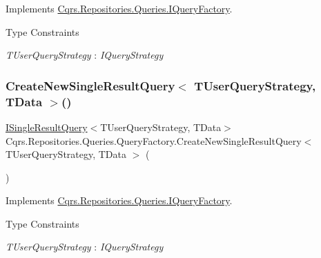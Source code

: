 Implements \hyperlink{interfaceCqrs_1_1Repositories_1_1Queries_1_1IQueryFactory_af8b443851e8112dc70cbc7fe32029ccb_af8b443851e8112dc70cbc7fe32029ccb}{Cqrs.\+Repositories.\+Queries.\+I\+Query\+Factory}.

\begin{Desc}
\item[Type Constraints]\begin{description}
\item[{\em T\+User\+Query\+Strategy} : {\em I\+Query\+Strategy}]\end{description}
\end{Desc}
\mbox{\label{classCqrs_1_1Repositories_1_1Queries_1_1QueryFactory_aefca41f8cab3f333984b782e7c87f3d1_aefca41f8cab3f333984b782e7c87f3d1}} 
\subsubsection{\texorpdfstring{Create\+New\+Single\+Result\+Query$<$ T\+User\+Query\+Strategy, T\+Data $>$()}{CreateNewSingleResultQuery< TUserQueryStrategy, TData >()}}
{\footnotesize\ttfamily \hyperlink{interfaceCqrs_1_1Repositories_1_1Queries_1_1ISingleResultQuery}{I\+Single\+Result\+Query}$<$T\+User\+Query\+Strategy, T\+Data$>$ Cqrs.\+Repositories.\+Queries.\+Query\+Factory.\+Create\+New\+Single\+Result\+Query$<$ T\+User\+Query\+Strategy, T\+Data $>$ (\begin{DoxyParamCaption}{ }\end{DoxyParamCaption})}



Implements \hyperlink{interfaceCqrs_1_1Repositories_1_1Queries_1_1IQueryFactory_a237aee0f99d8bfc03d8f10595f16ecea_a237aee0f99d8bfc03d8f10595f16ecea}{Cqrs.\+Repositories.\+Queries.\+I\+Query\+Factory}.

\begin{Desc}
\item[Type Constraints]\begin{description}
\item[{\em T\+User\+Query\+Strategy} : {\em I\+Query\+Strategy}]\end{description}
\end{Desc}


